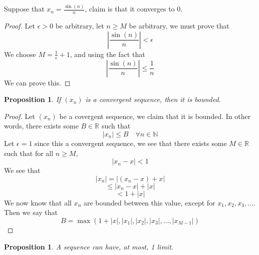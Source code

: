 \documentclass{article}
\newtheorem{proposition}[theorem]{Proposition}
\newtheorem{one minute paper}[theorem]{One Minute Paper}
\begin{document}
Suppose that $x_n = \frac{\sin(n)}{n}$, claim is that it converges to 0.

\begin{proof}
    Let $\epsilon > 0$ be arbitrary, let $n \geq M$ be arbitrary, we must prove that
    \begin{equation}
        |\frac{\sin(n)}{n}| < \epsilon
    \end{equation}
    We choose $M = \frac{1}{\epsilon} + 1$, and using the fact that 
    \begin{equation}
        |\frac{\sin(n)}{n}| \leq \frac{1}{n}
    \end{equation}
    We can prove this. 
\end{proof}

\begin{proposition}
    If $(x_n)$ is a convergent sequence, then it is bounded. 
\end{proposition}

\begin{proof}
    Let $(x_n)$ be a covergent sequence, we claim that it is bounded. In other words, there exists some $B \in \mathbb{R}$ such that 
    \begin{equation}
        |x_n| \leq B \quad \forall n \in \mathbb{N}
    \end{equation}
    Let $\epsilon = 1$ since this a convergent sequence, we see that there exists some $M \in \mathbb{R}$ such that for all $n \geq M$,
    \begin{equation}
        |x_n - x| < 1
    \end{equation}
    We see that
    \begin{equation}
        |x_n| = |(x_n - x) + x|
    \end{equation}
    \begin{equation}
        \leq |x_n - x| + |x|
    \end{equation}
    \begin{equation}
        < 1 + |x|
    \end{equation}
    We now know that all $x_n$ are bounded between this value, except for $x_1, x_2, x_3, \dots$. Then we say that
    \begin{equation}
        B = \max(1 + |x|, |x_1|, |x_2|, |x_3|, \dots, |x_{M-1}|)
    \end{equation}
\end{proof}

\begin{proposition}
    A sequence can have, at most, 1 limit. 
\end{proposition}
\end{document}

